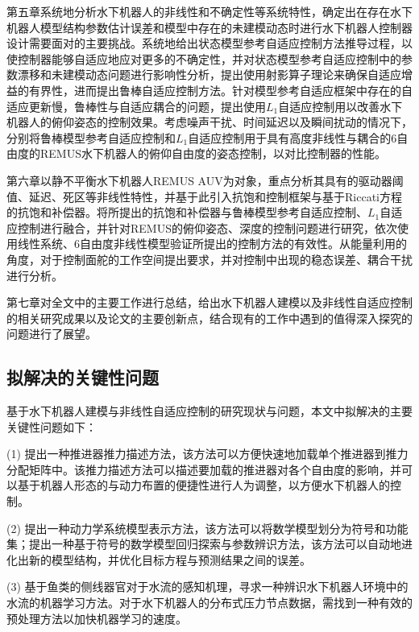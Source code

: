 第五章系统地分析水下机器人的非线性和不确定性等系统特性，确定出在存在水下机器人模型结构参数估计误差和模型中存在的未建模动态时进行水下机器人控制器设计需要面对的主要挑战。系统地给出状态模型参考自适应控制方法推导过程，以使控制器能够自适应地应对更多的不确定性，并对状态模型参考自适应控制中的参数漂移和未建模动态问题进行影响性分析，提出使用射影算子理论来确保自适应增益的有界性，进而提出鲁棒自适应控制方法。针对模型参考自适应框架中存在的自适应更新慢，鲁棒性与自适应耦合的问题，提出使用$L_{1}$自适应控制用以改善水下机器人的俯仰姿态的控制效果。考虑噪声干扰、时间延迟以及瞬间扰动的情况下，分别将鲁棒模型参考自适应控制和$L_{1}$自适应控制用于具有高度非线性与耦合的6自由度的REMUS水下机器人的俯仰自由度的姿态控制，以对比控制器的性能。


第六章以静不平衡水下机器人REMUS AUV为对象，重点分析其具有的驱动器阈值、延迟、死区等非线性特性，并基于此引入抗饱和控制框架与基于Riccati方程的抗饱和补偿器。将所提出的抗饱和补偿器与鲁棒模型参考自适应控制、$L_{1}$自适应控制进行融合，并针对REMUS的俯仰姿态、深度的控制问题进行研究，依次使用线性系统、6自由度非线性模型验证所提出的控制方法的有效性。从能量利用的角度，对于控制面舵的工作空间提出要求，并对控制中出现的稳态误差、耦合干扰进行分析。


第七章对全文中的主要工作进行总结，给出水下机器人建模以及非线性自适应控制的相关研究成果以及论文的主要创新点，结合现有的工作中遇到的值得深入探究的问题进行了展望。


\subsection{拟解决的关键性问题 }

基于水下机器人建模与非线性自适应控制的研究现状与问题，本文中拟解决的主要关键性问题如下：

(1) 提出一种推进器推力描述方法，该方法可以方便快速地加载单个推进器到推力分配矩阵中。该推力描述方法可以描述要加载的推进器对各个自由度的影响，并可以基于机器人形态的与动力布置的便捷性进行人为调整，以方便水下机器人的控制。

(2) 提出一种动力学系统模型表示方法，该方法可以将数学模型划分为符号和功能集；提出一种基于符号的数学模型回归探索与参数辨识方法，该方法可以自动地进化出新的模型结构，并优化目标方程与预测结果之间的误差。


(3) 基于鱼类的侧线器官对于水流的感知机理，寻求一种辨识水下机器人环境中的水流的机器学习方法。对于水下机器人的分布式压力节点数据，需找到一种有效的预处理方法以加快机器学习的速度。


